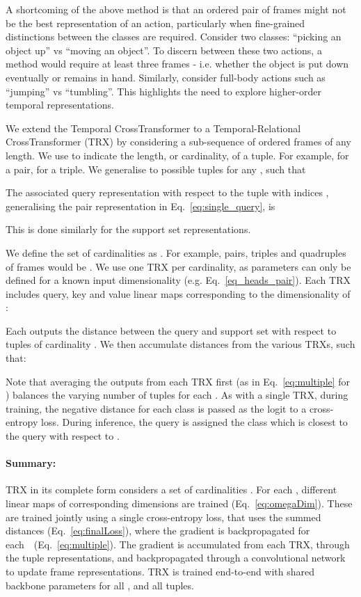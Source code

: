 \documentclass[final]{cvpr}
\begin{document}
A shortcoming of the above method is that an ordered pair of frames might not be the best representation of an action, particularly when fine-grained distinctions between the classes are required.  Consider two classes: ``picking an object up'' vs ``moving an object''.  To discern between these two actions, a method would require at least three frames - i.e. whether the object is put down eventually or remains in hand. Similarly, consider full-body actions such as ``jumping'' vs ``tumbling''.  This highlights the need to explore higher-order temporal representations.

We extend the Temporal CrossTransformer to a Temporal-Relational CrossTransformer (TRX) by considering a sub-sequence of ordered frames of any length.  We use  to indicate the length, or cardinality, of a tuple.  For example,  for a pair,  for a triple. We generalise to possible tuples for any , such that

The associated query representation with respect to the tuple with indices , generalising the pair representation in Eq.~\ref{eq:single_query}, is

This is done similarly for the support set representations.

We define the set of cardinalities as  .  For example, pairs, triples and quadruples of frames would be .
We use one TRX per cardinality, as parameters can only be defined for a known input dimensionality (e.g. Eq.~\ref{eq_heads_pair}).
Each TRX 
includes query, key and value linear maps corresponding to the dimensionality of :

Each  outputs the distance between the query and support set with respect to tuples of cardinality .  
We then accumulate distances from the various TRXs, such that:

Note that averaging the outputs from each TRX first (as in Eq.~\ref{eq:multiple} for ) balances the varying number of tuples for each .
As with a single TRX, during training, the negative distance for each class is passed as the logit to a cross-entropy loss.  
During inference, the query is assigned the class which is closest to the query with respect to .

\vspace{-10pt}
\paragraph{Summary:}
TRX in its complete form considers a set of cardinalities . For each , different linear maps of corresponding dimensions are trained (Eq.~\ref{eq:omegaDim}). These are trained jointly using a single cross-entropy loss, that uses the summed distances (Eq.~\ref{eq:finalLoss}), where the gradient is backpropagated for each~~(Eq.~\ref{eq:multiple}).
The gradient is accumulated from each TRX, through the tuple representations, and backpropagated through a convolutional network to update frame representations. TRX is trained end-to-end with shared backbone parameters for all , and all tuples.
\end{document}
